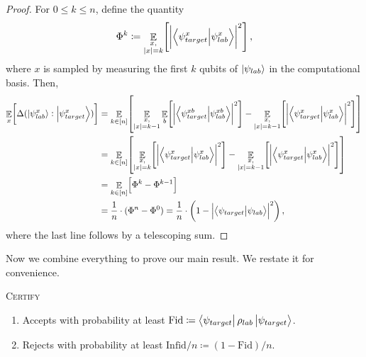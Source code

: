 \begin{proof}
    For $0\leq k\leq n$, define the quantity
    \[
        \Phi^k \coloneqq \mathop{\mathbb{E}}_{\substack{x,\\ |x|=k}}\!\left[{\left| \braket{\psi_{target}^{x}}{\psi_{lab}^{x}} \right|}^2\right],
    \]
    where $x$ is sampled by measuring the first $k$ qubits of $\ket{\psi_{lab}}$ in the computational basis. Then,
    \begin{align*}
        \mathop{\mathbb{E}}_{x}\!\left[\Delta(\ket{\psi_{lab}^x}:\ket{\psi_{target}^x})\right]
        &= \mathop{\mathbb{E}}_{k\in[n]}\!\left[\mathop{\mathbb{E}}_{\substack{x,\\ |x|=k-1}}\mathop{\mathbb{E}}_{b}\!\left[\abs{\braket{\psi_{target}^{xb}}{\psi_{lab}^{xb}}}^2\right] - \mathop{\mathbb{E}}_{\substack{x,\\ |x|=k-1}}\!\left[\abs{\braket{\psi_{target}^x}{\psi_{lab}^x}}^2\right]\right]\\
        &= \mathop{\mathbb{E}}_{k\in[n]}\!\left[\mathop{\mathbb{E}}_{\substack{x,\\ |x|=k}}\!\left[\abs{\braket{\psi_{target}^{x}}{\psi_{lab}^{x}}}^2\right] - \mathop{\mathbb{E}}_{\substack{x,\\ |x|=k-1}}\!\left[\abs{\braket{\psi_{target}^x}{\psi_{lab}^x}}^2\right]\right]\\
        &= \mathop{\mathbb{E}}_{k\in[n]}\!\left[\Phi^k - \Phi^{k-1}\right]\\
        &= \frac{1}{n}\cdot(\Phi^n - \Phi^0) = \frac{1}{n}\cdot\left(1 - \abs{\braket{\psi_{target}}{\psi_{lab}}}^2\right),
    \end{align*}
    where the last line follows by a telescoping sum.
\end{proof}

Now we combine everything to prove our main result. We restate it for convenience.

\begin{theorem}
    \textsc{Certify} 
\begin{enumerate}
    \item Accepts with probability at least $\mathrm{Fid} \coloneqq \bra{\psi_{target}}\rho_{lab}\ket{\psi_{target}}$.
    \item Rejects with probability at least $\mathrm{Infid}/n \coloneqq (1-\mathrm{Fid})/n$.
\end{enumerate}
\end{theorem}

